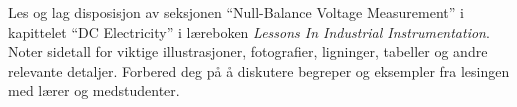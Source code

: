 

Les og lag disposisjon av seksjonen ``Null-Balance Voltage Measurement'' i kapittelet ``DC Electricity'' i læreboken {\it Lessons In Industrial Instrumentation}. Noter sidetall for viktige illustrasjoner, fotografier, ligninger, tabeller og andre relevante detaljer. Forbered deg på å diskutere begreper og eksempler fra lesingen med lærer og medstudenter.















